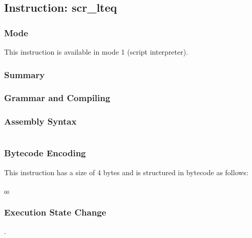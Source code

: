 \subsection{Instruction: scr\_lteq}

\subsubsection{Mode}
This instruction is available in mode 1 (script interpreter).
\subsubsection{Summary}


\subsubsection{Grammar and Compiling}


\subsubsection{Assembly Syntax}

\begin{myquote}
\begin{verbatim}

\end{verbatim}
\end{myquote}

\subsubsection{Bytecode Encoding}

This instruction has a size of 4 bytes and is structured in bytecode as follows:

$_{00}$\ 

\subsubsection{Execution State Change}

.


